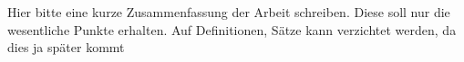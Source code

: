 
\thispagestyle{empty} 
Hier bitte eine kurze Zusammenfassung der Arbeit schreiben.
Diese soll nur die wesentliche Punkte erhalten.
Auf Definitionen, Sätze \etc kann verzichtet werden, da dies ja später kommt
\cleardoubleoddpage
